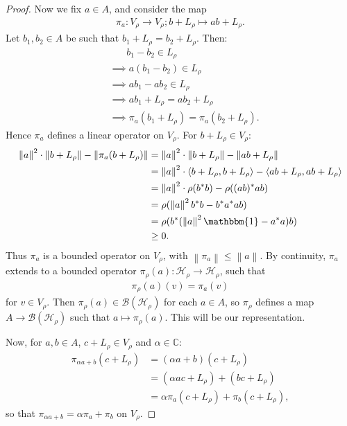 \documentclass[11pt,a4paper]{report}
\theoremstyle{plain}
\theoremstyle{definition}
\newcommand{\1}{\mathbbm{1}}
\newcommand{\B}{\mathcal{B}}
\newcommand{\Hr}{\mathcal{H}_\rho}
\newcommand{\Vr}{V_\rho}
\newcommand{\Lr}{L_\rho}
\begin{document}
\begin{proof}
	Now we fix $a \in A$, and consider the map 
	\begin{align*}
		\pi_a : V_\rho \to V_\rho; b+L_\rho \mapsto ab+L_\rho.
	\end{align*}
	Let $b_1, b_2 \in A$ be such that $b_1+L_\rho = b_2+L_\rho$. Then:
	\begin{align*}
		&~~~~~~~~	b_1-b_2 \in L_\rho													\\	
		&\implies	a(b_1-b_2) \in L_\rho												\\	
		&\implies	ab_1-ab_2 \in L_\rho												\\	
		&\implies	ab_1 + L_\rho = ab_2+L_\rho											\\	
		&\implies	\pi_a(b_1+L_\rho) = \pi_a(b_2+L_\rho).
	\end{align*}
	Hence $\pi_a$ defines a linear operator on $V_\rho$.
	For $b+L_\rho \in V_\rho$:
	\begin{align*}
				\left\|a\right\|^2 \cdot \left\|b+L_\rho\right\| 
									- \left\| \pi_a(b+L_\rho) \right\|
		&=		\left\|a\right\|^2 \cdot \left\|b+L_\rho\right\| 
									- \left\| ab+L_\rho \right\|						\\
		&=		\left\|a\right\|^2 \cdot \langle b+L_\rho,b+L_\rho \rangle 
									- \langle ab+L_\rho,ab+L_\rho \rangle				\\
		&=		\left\|a\right\|^2 \cdot \rho(b^\ast b) - \rho ((ab)^\ast ab)			\\
		&= 		\rho (\left\|a\right\|^2 b^\ast b-b^\ast a^\ast ab)						\\
		&=		\rho (b^\ast (\left\|a\right\|^{2} \mathbbm{1} - a ^\ast a)b)			\\
		&\geq 	0.
	\end{align*}
	Thus $\pi_a$ is a bounded operator on $\Vr$, with $\left\|\pi_a\right\| \leq 
	\left\|a\right\|$. By continuity, $\pi_a$ extends to a bounded operator 
	$\pi_\rho(a):\Hr \to \Hr$, such that 
	\begin{align*} 
		\pi_\rho(a)(v) = \pi_a(v) 
	\end{align*} 
	for $v\in \Vr$. 
	Then $\pi_\rho(a) \in \B(\Hr)$ for each $a \in A$, so $\pi_\rho$ defines a map 
	$A \to \B(\Hr)$ such that $ a \mapsto \pi_\rho(a)$. This will be our 
	representation.

	
	Now, for $a,b \in A$, $c+ L_\rho \in \Vr$ and $\alpha \in \mathbb{C}$:
	\begin{align*}
				\pi_{\alpha a+b}(c+\Lr)
		&=		(\alpha a+b) (c+\Lr)													\\
		&=		(\alpha ac +\Lr) + (bc+\Lr)												\\
		&=		\alpha \pi_a (c+\Lr) + \pi_b(c+\Lr),
	\end{align*}
	so that $\pi_{\alpha a + b} = \alpha \pi_a +\pi_b$ on $\Vr$.
	

\end{proof}
\end{document}
